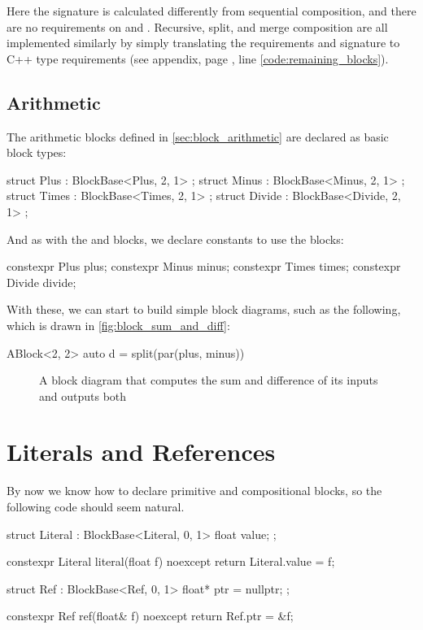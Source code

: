 Here the signature is calculated differently from sequential composition, and there are no requirements on
 and . Recursive, split, and merge composition are all
implemented similarly by simply translating the requirements and signature to C++ type requirements (see
appendix, page \pageref{code:remaining_blocks}, line \ref{code:remaining_blocks}).

\subsection{Arithmetic}

The arithmetic blocks defined in \autoref{sec:block_arithmetic} are declared as basic block types:

\begin{cppcodenl}
  struct Plus : BlockBase<Plus, 2, 1> {};
  struct Minus : BlockBase<Minus, 2, 1> {};
  struct Times : BlockBase<Times, 2, 1> {};
  struct Divide : BlockBase<Divide, 2, 1> {};
\end{cppcodenl}

And as with the \Ident and \Cut blocks, we declare constants to use the blocks:
\begin{cppcodenl}
  constexpr Plus plus;
  constexpr Minus minus;
  constexpr Times times;
  constexpr Divide divide;
\end{cppcodenl}

With these, we can start to build simple block diagrams, such as the following, which is drawn in
\autoref{fig:block_sum_and_diff}:

\begin{cppcodenl}
  ABlock<2, 2> auto d = split(par(plus, minus))
\end{cppcodenl}

\begin{figure}
  \centering
  
  \caption{A block diagram that computes the sum and difference of its inputs and outputs both}
  \label{fig:block_sum_and_diff}
\end{figure}

\section{Literals and References}
\label{sec:eda_lit_and_ref}

By now we know how to declare primitive and compositional blocks, so the following code should seem natural.
\begin{cppcodenl}
  struct Literal : BlockBase<Literal, 0, 1> {
    float value;
  };

  constexpr Literal literal(float f) noexcept {
    return Literal{.value = f};
  }

  struct Ref : BlockBase<Ref, 0, 1> {
    float* ptr = nullptr;
  };

  constexpr Ref ref(float& f) noexcept
  {
    return Ref{.ptr = &f};
  }
\end{cppcodenl}

